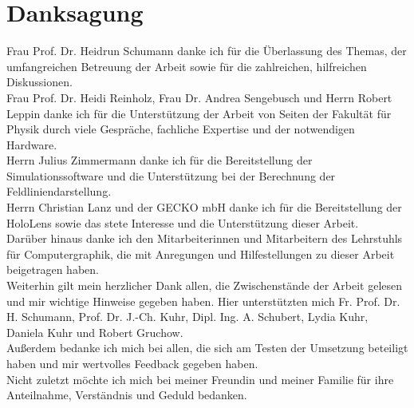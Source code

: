 \section*{Danksagung}
Frau Prof. Dr. Heidrun Schumann danke ich für die Überlassung des Themas, der umfangreichen Betreuung der Arbeit sowie für die zahlreichen, hilfreichen Diskussionen.\\

Frau Prof. Dr. Heidi Reinholz, Frau Dr. Andrea Sengebusch und Herrn Robert Leppin danke ich für die Unterstützung der Arbeit von Seiten der Fakultät für Physik durch viele Gespräche, fachliche Expertise und der notwendigen Hardware.\\

Herrn Julius Zimmermann danke ich für die Bereitstellung der Simulationssoftware und die Unterstützung bei der Berechnung der Feldliniendarstellung.\\

Herrn Christian Lanz und der GECKO mbH danke ich für die Bereitstellung der HoloLens sowie das stete Interesse und die Unterstützung dieser Arbeit.\\

Darüber hinaus danke ich den Mitarbeiterinnen und Mitarbeitern des Lehrstuhls für Computergraphik, die mit Anregungen und Hilfestellungen zu dieser Arbeit beigetragen haben.\\

Weiterhin gilt mein herzlicher Dank allen, die Zwischenstände der Arbeit gelesen und mir wichtige Hinweise gegeben haben. Hier unterstützten mich Fr. Prof. Dr. H. Schumann, Prof. Dr. J.-Ch. Kuhr, Dipl. Ing. A. Schubert, Lydia Kuhr, Daniela Kuhr und Robert Gruchow.\\

Außerdem bedanke ich mich bei allen, die sich am Testen der Umsetzung beteiligt haben und mir wertvolles Feedback gegeben haben.\\

Nicht zuletzt möchte ich mich bei meiner Freundin und meiner Familie für ihre Anteilnahme, Verständnis und Geduld bedanken.